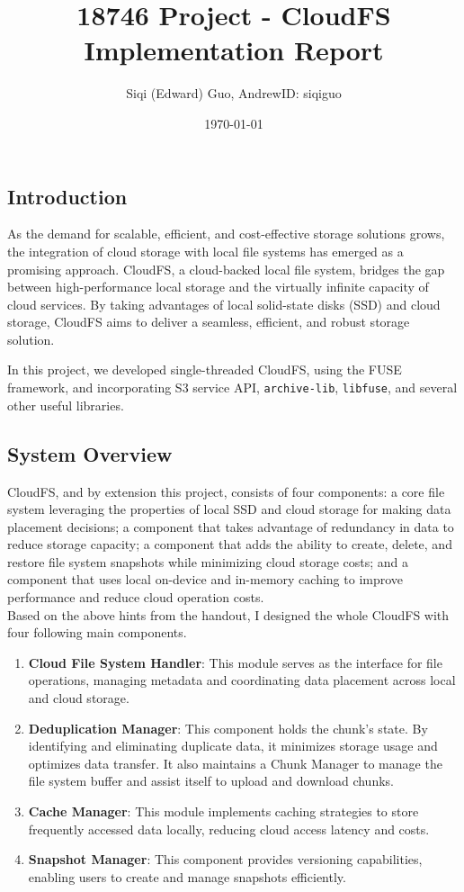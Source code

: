 \documentclass[10pt]{article}
\title{18746 Project - CloudFS Implementation Report}
\author{Siqi (Edward) Guo, AndrewID: siqiguo}
\date{\today}
\begin{document}
\maketitle


\subsection*{Introduction}
As the demand for scalable, efficient, and cost-effective storage solutions grows,
the integration of cloud storage with local file systems has emerged as a promising approach.
CloudFS, a cloud-backed local file system,
bridges the gap between high-performance local storage and the virtually infinite capacity of cloud services.
By taking advantages of local solid-state disks (SSD) and cloud storage,
CloudFS aims to deliver a seamless, efficient, and robust storage solution.

In this project, we developed single-threaded CloudFS, using the FUSE framework, and incorporating S3 service API,
\texttt{archive-lib}, \texttt{libfuse}, and several other useful libraries.


\subsection*{System Overview}
CloudFS, and by extension this project, consists of four components: a core file system leveraging the
properties of local SSD and cloud storage for making data placement decisions; a component that takes
advantage of redundancy in data to reduce storage capacity; a component that adds the ability to create,
delete, and restore file system snapshots while minimizing cloud storage costs; and a component that uses
local on-device and in-memory caching to improve performance and reduce cloud operation costs. \\
Based on the above hints from the handout, I designed the whole CloudFS with four following main components.

\begin{enumerate}
    \item \textbf{Cloud File System Handler}: This module serves as the interface for file operations, managing metadata and coordinating data placement across local and cloud storage.
    \item \textbf{Deduplication Manager}: This component holds the chunk's state. By identifying and eliminating duplicate data, it minimizes storage usage and optimizes data transfer. It also maintains a Chunk Manager to manage the file system buffer and assist itself to upload and download chunks.
    \item \textbf{Cache Manager}: This module implements caching strategies to store frequently accessed data locally, reducing cloud access latency and costs.
    \item \textbf{Snapshot Manager}: This component provides versioning capabilities, enabling users to create and manage snapshots efficiently.
\end{enumerate}
\end{document}
